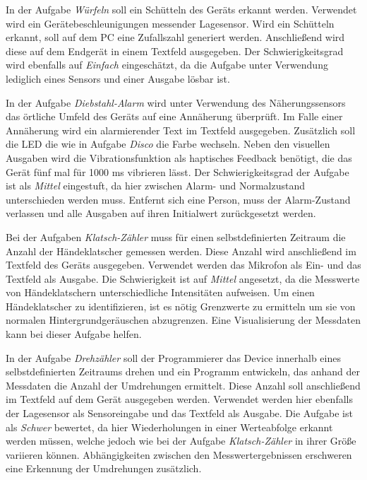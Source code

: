 \documentclass[11pt,a4paper]{report}
\begin{document}
In der Aufgabe \textit{Würfeln} soll ein Schütteln des Geräts erkannt werden.
Verwendet wird ein Gerätebeschleunigungen messender Lagesensor.
Wird ein Schütteln erkannt, soll auf dem PC eine Zufallszahl generiert werden.
Anschließend wird diese auf dem Endgerät in einem Textfeld ausgegeben.
Der Schwierigkeitsgrad wird ebenfalls auf \textit{Einfach} eingeschätzt, da die Aufgabe unter Verwendung lediglich eines Sensors und einer Ausgabe lösbar ist.

In der Aufgabe \textit{Diebstahl-Alarm} wird unter Verwendung des Näherungssensors das örtliche Umfeld des Geräts auf eine Annäherung überprüft.
Im Falle einer Annäherung wird ein alarmierender Text im Textfeld ausgegeben.
Zusätzlich soll die LED die wie in Aufgabe \textit{Disco} die Farbe wechseln.
Neben den visuellen Ausgaben wird die Vibrationsfunktion als haptisches Feedback benötigt, die das Gerät fünf mal für 1000 ms vibrieren lässt.
Der Schwierigkeitsgrad der Aufgabe ist als \textit{Mittel} eingestuft, da hier zwischen Alarm- und Normalzustand unterschieden werden muss.
Entfernt sich eine Person, muss der Alarm-Zustand verlassen und alle Ausgaben auf ihren Initialwert zurückgesetzt werden.

Bei der Aufgaben \textit{Klatsch-Zähler} muss für einen selbstdefinierten Zeitraum die Anzahl der Händeklatscher gemessen werden.
Diese Anzahl wird anschließend im Textfeld des Geräts ausgegeben.
Verwendet werden das Mikrofon als Ein- und das Textfeld als Ausgabe.
Die Schwierigkeit ist auf \textit{Mittel} angesetzt, da die Messwerte von Händeklatschern unterschiedliche Intensitäten aufweisen.
Um einen Händeklatscher zu identifizieren, ist es nötig Grenzwerte zu ermitteln um sie von normalen Hintergrundgeräuschen abzugrenzen.
Eine Visualisierung der Messdaten kann bei dieser Aufgabe helfen.

In  der Aufgabe \textit{Drehzähler} soll der Programmierer das Device innerhalb eines selbstdefinierten Zeitraums drehen und ein Programm entwickeln, das anhand der Messdaten die Anzahl der Umdrehungen ermittelt.
Diese Anzahl soll anschließend im Textfeld auf dem Gerät ausgegeben werden.
Verwendet werden hier ebenfalls der Lagesensor als Sensoreingabe und das Textfeld als Ausgabe.
Die Aufgabe ist als \textit{Schwer} bewertet, da hier Wiederholungen in einer Werteabfolge erkannt werden müssen, welche jedoch wie bei der Aufgabe \textit{Klatsch-Zähler} in ihrer Größe variieren können.
Abhängigkeiten zwischen den Messwertergebnissen erschweren eine Erkennung der Umdrehungen zusätzlich.
\end{document}
